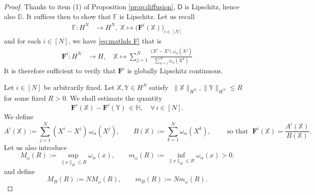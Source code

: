 \documentclass[10pt,a4paper]{amsart}
\begin{document}
\begin{proof}
Thanks to item (1) of Proposition \ref{prop:diffusion}, $\mathsf{D}$ is Lipschitz, hence also $\mathbb{D}$. It suffices then to show that $\mathds{F}$ is Lipschitz. 
Let us recall 
\begin{equation*}
\begin{aligned}
    \mathds{F}: H^N & \longrightarrow H^N,\;
        \mathds{X}  \longmapsto \big( \mathbf{F}^{i}(\mathds{X}) \big)_{i\in [N]} %
\end{aligned}
\end{equation*}
and for each $i\in [N]$, we have \eqref{eq:mathds F} that is
\begin{equation*}
\begin{aligned}
    \mathbf{F}^{i}: H^N & \longrightarrow H,\quad
        \mathds{X}  \longmapsto \sum\limits_{j=1}^{N}\,\frac{\big(X^{i}-X^{j}\big)\; \omega_{\alpha}(X^{j})}{\sum\limits_{k=1}^{N}\omega_{\alpha}(X^{k})}
\end{aligned}
\end{equation*}
It is therefore sufficient to verify that $\mathbf{F}^i$ is globally Lipschitz continuous. 



Let $i\in[N]$ be arbitrarily fixed. 
Let $\mathds{X}, \mathds{Y} \in H^N$ satisfy $\;\|\mathds{X}\|_{H^N}, \|\mathds{Y}\|_{H^N} \le R\;$
for some fixed $R>0$. 
We shall estimate the quantity 
\begin{equation*}
    \mathbf{F}^{i}(\mathds{X}) - \mathbf{F}^{i}(\mathds{Y}) \, \in \mathbb{H},\quad \forall\, i\in [N].
\end{equation*}
We define
\begin{equation*}
    A^i(\mathds{X}) := \sum_{j=1}^N (X^i - X^j)\,\omega_\alpha(X^j), \qquad B(\mathds{X}) := \sum_{k=1}^N \omega_\alpha(X^k), \qquad \text{ so that } \; \mathbf{F}^i(\mathds{X}) = \frac{A^i(\mathds{X})}{B(\mathds{X})}.
\end{equation*}
Let us also introduce
\begin{equation*}
    M_\omega(R) := \sup_{\|x\|_H \le R} \omega_\alpha(x), \qquad m_\omega(R) := \inf_{\|x\|_H \le R} \omega_\alpha(x) > 0.
\end{equation*}
and define
\begin{equation*}
    M_B(R) := N M_\omega(R), \qquad m_B(R) := N m_\omega(R).
\end{equation*}


\end{proof}
\end{document}
